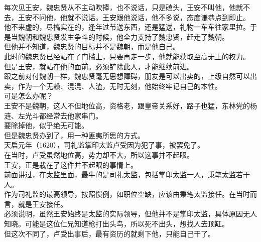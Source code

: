 \begin{multicols}{\theparacolNo}
每次见王安，魏忠贤从不主动吹捧，也不说话，只是磕头，王安不叫他，他就不去，王安不问他，他就不说话。王安跟他说话，他不多说，态度谦恭点到即止。\\

他不来虚的，尽搞实在的，逢年过节送东西，还是猛送，礼物一车车往家里拉。于是当魏朝和魏忠贤发生争斗的时候，他全力支持了魏忠贤，赶走了魏朝。\\

但他并不知道，魏忠贤的目标并不是魏朝，而是他自己。\\

此时的魏忠贤已经站在了门槛上，只要再走一步，他就能获取至高无上的权力。\\

但是王安，就站在他的面前。必须铲除此人，才能继续前进。\\

跟之前对付魏朝一样，魏忠贤毫无思想障碍，朋友是可以出卖的，上级自然可以出卖，作为一个无赖、混混、人渣，无时无刻，他始终牢记自己的本性。\\

可是怎么办呢？\\

王安不是魏朝，这人不但地位高，资格老，跟皇帝关系好，路子也猛，东林党的杨涟、左光斗都经常去他家串门。\\

要除掉他，似乎绝无可能。\\

但是魏忠贤办到了，用一种匪夷所思的方式。\\

天启元年（1620），司礼监掌印太监卢受因为犯了事，被罢免了。\\

在当时，卢受虽然地位高，势力却不大，所以这事并不起眼。\\

王安，正是栽在了这件并不起眼的事情上。\\

前面讲过，在太监里面，最牛的是司礼太监，包括掌印太监一人，秉笔太监若干人。\\

作为司礼监的最高领导，按照惯例，如职位空缺，应该由秉笔太监接任。在当时而言，就是王安接任。\\

必须说明，虽然王安始终是太监的实际领导，但他并不是掌印太监，具体原因无人知晓。可能是这位仁兄知道枪打出头鸟，所以死不出头，想找人去顶缸。\\

但这次不同了，卢受出事后，最有资历的就剩下他，只能自己干了。\\


\end{multicols}
